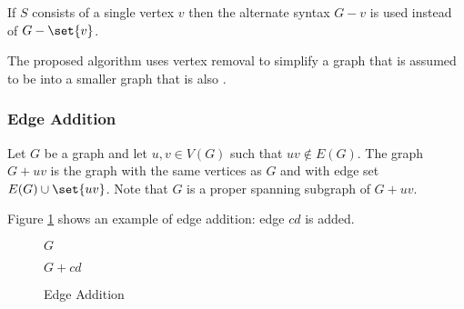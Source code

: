 If \(S\) consists of a single vertex \(v\) then the alternate syntax \(G-v\) is used instead of \(G-\set{v}\).

The proposed algorithm uses vertex removal to simplify a graph that is assumed to be  into a smaller
graph that is also .

\subsubsection{Edge Addition}

Let \(G\) be a graph and let \(u,v\in V(G)\) such that \(uv\notin E(G)\).  The graph \(G+uv\) is the graph with the
same vertices as \(G\) and with edge set \(E(G)\cup\set{uv}\).  Note that \(G\) is a proper spanning subgraph of
\(G+uv\).

Figure \ref{fig:eadd} shows an example of edge addition: edge \(cd\) is added.

\begin{figure}[h]
  \label{fig:eadd}
  \begin{minipage}{3in}
    \begin{center}

      \bigskip

      \(G\)
    \end{center}
  \end{minipage}
  \begin{minipage}{3in}
    \begin{center}

      \bigskip

      \(G+cd\)
    \end{center}
  \end{minipage}
  \caption{Edge Addition}
\end{figure}

